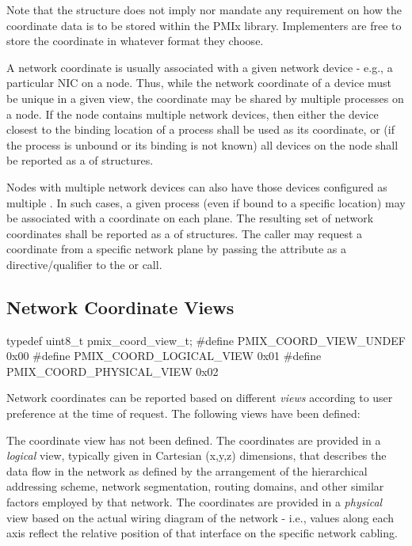 \adviceimplstart
Note that the  structure does not imply nor mandate any requirement on how the coordinate data is to be stored within the \ac{PMIx} library. Implementers are free to store the coordinate in whatever format they choose.
\adviceimplend

A network coordinate is usually associated with a given network device - e.g., a particular \ac{NIC} on a node. Thus, while the network coordinate of a device must be unique in a given view, the coordinate may be shared by multiple processes on a node. If the node contains multiple network devices, then either the device closest to the binding location of a process shall be used as its coordinate, or (if the process is unbound or its binding is not known) all devices on the node shall be reported as a  of  structures.

Nodes with multiple network devices can also have those devices configured as multiple . In such cases, a given process (even if bound to a specific location) may be associated with a coordinate on each plane. The resulting set of network coordinates shall be reported as a  of  structures. The caller may request a coordinate from a specific network plane by passing the  attribute as a directive/qualifier to the  or  call.

\subsection{Network Coordinate Views}

\cspecificstart
\begin{codepar}
typedef uint8_t pmix_coord_view_t;
#define PMIX_COORD_VIEW_UNDEF       0x00
#define PMIX_COORD_LOGICAL_VIEW     0x01
#define PMIX_COORD_PHYSICAL_VIEW    0x02
\end{codepar}
\cspecificend

Network coordinates can be reported based on different \emph{views} according to user preference at the time of request. The following views have been defined:

\begin{constantdesc}
%
The coordinate view has not been defined.
%
The coordinates are provided in a \emph{logical} view, typically given in Cartesian (x,y,z) dimensions, that describes the data flow in the network as defined by the arrangement of the hierarchical addressing scheme, network segmentation, routing domains, and other similar factors employed by that network.
%
The coordinates are provided in a \emph{physical} view based on the actual wiring diagram of the network - i.e., values along each axis reflect the relative position of that interface on the specific network cabling.
%
\end{constantdesc}

